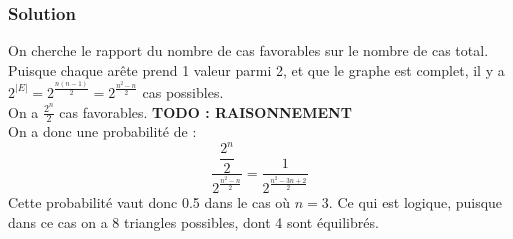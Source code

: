     \subsubsection*{Solution}
    On cherche le rapport du nombre de cas favorables sur le nombre de cas total.\\
    Puisque chaque arête prend 1 valeur parmi 2, et que le graphe est complet, il y a $2^{|E|} = 2^{\frac{n(n-1)}{2}} = 2^{\frac{n^2-n}{2}}$ cas possibles.\\
    On a $\frac{2^n}{2}$ cas favorables. \textbf{TODO : RAISONNEMENT}\\
    On a donc une probabilité de :
    $$ \dfrac{\dfrac{2^n}{2}}{2^{\frac{n^2-n}{2}}} = \dfrac{1}{2^{\frac{n^2-3n+2}{2}}}$$
    \noindent Cette probabilité vaut donc 0.5 dans le cas où $n=3$.
    Ce qui est logique, puisque dans ce cas on a 8 triangles possibles, dont 4 sont équilibrés.
    
    
    